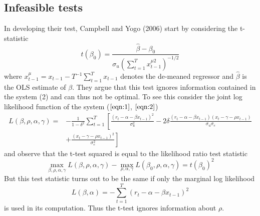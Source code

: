 \documentclass{article}
\begin{document}
\subsection{Infeasible tests}
In developing their test, Campbell and Yogo (2006) start by considering the t-statistic 
\begin{equation}
t\left(\beta_{0}\right)=\frac{\widehat{\beta}-\beta_{0}}{\sigma_{u}\left(\sum_{t=1}^{T} x_{t-1}^{\mu 2}\right)^{-1 / 2}}
\end{equation}
where $x_{t-1}^{\mu}=x_{t-1}-T^{-1} \sum_{t=1}^{T} x_{t-1}$ denotes the de-meaned regressor and $\widehat{\beta}$ is the OLS estimate of $\beta$. They argue that this test ignores information contained in the system (2) and can thus not be optimal. To see this consider the joint log likelihood function of the system ($\ref{eqn:1}$, $\ref{eqn:2}$)
\begin{equation}
\begin{aligned} L(\beta, \rho, \alpha, \gamma)=&-\frac{1}{1-\delta^{2}} \sum_{t=1}^{T}\left[\frac{\left(r_{t}-\alpha-\beta x_{t-1}\right)^{2}}{\sigma_{u}^{2}}-2 \delta \frac{\left(r_{t}-\alpha-\beta x_{t-1}\right)\left(x_{t}-\gamma-\rho x_{t-1}\right)}{\sigma_{u} \sigma_{e}}\right.\\ &\left.+\frac{\left(x_{t}-\gamma-\rho x_{t-1}\right)^{2}}{\sigma_{e}^{2}}\right] \end{aligned}
\end{equation}
and observe that the t-test squared is equal to the likelihood ratio test statistic
\begin{equation}
\max _{\beta, \rho, \alpha, \gamma} L(\beta, \rho, \alpha, \gamma)-\max _{\rho, \alpha, \gamma} L\left(\beta_{0}, \rho, \alpha, \gamma\right)=t\left(\beta_{0}\right)^{2}
\end{equation}
But this test statistic turns out to be the same if only the marginal log likelihood 
\begin{equation}
L(\beta, \alpha)=-\sum_{t=1}^{T}\left(r_{t}-\alpha-\beta x_{t-1}\right)^{2}
\end{equation}
is used in its computation. Thus the t-test ignores information about $\rho$.
\end{document}
